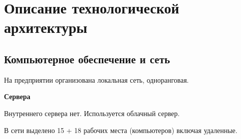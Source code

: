 \newpage

\chapter{Описание технологической архитектуры}

\section{Компьютерное обеспечение и сеть}

На предприятии организована локальная сеть, одноранговая. 






\textbf{Сервера}

Внутреннего сервера нет. 
Используется облачный сервер.




В сети выделено 15 + 18 рабочих места (компьютеров) включая удаленные.



